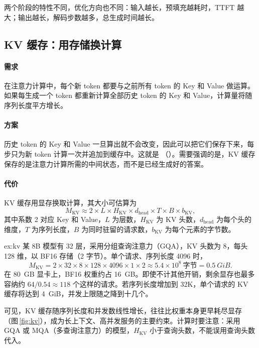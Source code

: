 两个阶段的特性不同，优化方向也不同：输入越长，预填充越耗时，TTFT 越大；输出越长，解码步数越多，总生成时间越长。

\subsection{KV 缓存：用存储换计算}
\label{subsec:kvcache}

\paragraph{需求} 在注意力计算中，每个新 token 都要与之前所有 token 的 Key 和 Value 做运算。如果每生成一个 token 都重新计算全部历史 token 的 Key 和 Value，计算量将随序列长度平方增长。

\paragraph{方案} 历史 token 的 Key 和 Value 一旦算出就不会改变，因此可以把它们保存下来，每步只为新 token 计算一次并追加到缓存中。这就是 （）。需要强调的是，KV 缓存保存的是注意力计算所需的中间状态，而不是已经生成好的答案。

\paragraph{代价} KV 缓存用显存换取计算，其大小可估算为
\begin{equation}
  M_{\mathrm{KV}} \approx 2 \times L \times H_{\mathrm{KV}} \times d_{\mathrm{head}} \times T \times B \times b_{\mathrm{KV}},
  \label{eq:kv}
\end{equation}
其中系数 2 对应 Key 和 Value，$L$ 为层数，$H_{\mathrm{KV}}$ 为 KV 头数，$d_{\mathrm{head}}$ 为每个头的维度，$T$ 为序列长度，$B$ 为同时驻留的请求数，$b_{\mathrm{KV}}$ 为每个元素的字节数。

\begin{example}[KV 缓存与并发上限]{ex:kv}
某 8B 模型有 32 层，采用分组查询注意力（GQA），KV 头数为 8，每头 128 维，以 BF16 存储（2 字节）。单个请求、序列长度 4096 时，
\[
  M_{\mathrm{KV}} = 2\times32\times8\times128\times4096\times1\times2 \approx 5.4\times10^{8}\ \text{字节} = \SI{0.5}{GiB}.
\]
在 \SI{80}{GB} 显卡上，BF16 权重约占 \SI{16}{GB}。即使不计其他开销，剩余显存也最多容纳约 $64/0.54\approx 118$ 个这样的请求。若序列长度增加到 32K，单个请求的 KV 缓存将达到 \SI{4}{GiB}，并发上限随之降到十几个。
\end{example}

可见，KV 缓存随序列长度和并发数线性增长，往往比权重本身更早耗尽显存（图\,\ref{fig:kv}），成为长上下文、高并发服务的主要约束。计算时要注意：采用 GQA 或 MQA（多查询注意力）的模型，$H_{\mathrm{KV}}$ 小于查询头数，不能误用查询头数代入。

